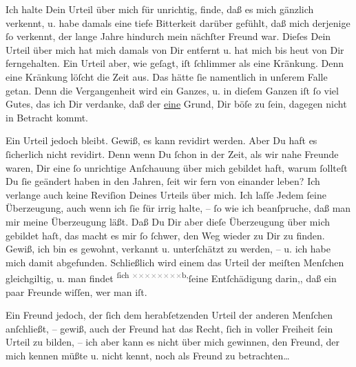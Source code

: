 \pstart
           Ich halte Dein Urteil über mich für unrichtig, finde, daß es mich gänzlich verkennt,
               u. habe \strikeout{\textcolor{gray}{d}} damals eine tiefe Bitterkeit darüber gefühlt, daß mich derjenige ſo verkennt,
               der lange Jahre hindurch mein nächſter Freund war. Dieſes Dein Urteil über mich hat
               mich damals von Dir entfernt u. hat mich bis heut von Dir ferngehalten. Ein Urteil
               aber, wie geſagt, {\pb}iſt ſchlimmer als eine
               Kränkung. Denn eine Kränkung löſcht die Zeit aus. Das hätte ſie namentlich in unſerem
               Falle getan. \strikeout{\textcolor{gray}{S}} Denn die Vergangenheit wird ein Ganzes, u. in dieſem Ganzen iſt ſo viel Gutes,
               das ich Dir verdanke, daß der \uline{eine} Grund, Dir böſe zu
               ſein, dagegen nicht in Betracht kommt.\pend
           
\pstart
           Ein Urteil jedoch bleibt. Gewiß, es kann revidirt werden. Aber Du haft es ſicherlich
               nicht revidirt. Denn wenn Du ſchon in der Zeit, als wir nahe Freunde waren, Dir eine
               ſo unrichtige Anſchauung über mich {\pb}gebildet
               haft, warum ſollteſt Du ſie geändert haben in den Jahren, ſeit wir fern von einander
               leben? Ich verlange auch keine Reviſion Deines Urteils über mich. Ich laſſe Jedem
               ſeine Überzeugung, auch wenn ich ſie für irrig halte, – ſo wie ich beanſpruche, daß
               man mir meine Überzeugung läßt. Daß Du Dir aber dieſe Überzeugung über mich gebildet
               haſt, das macht es mir ſo ſchwer, den Weg wieder zu Dir zu finden. Gewiß, ich bin es
               gewohnt, verkannt u. unterſchätzt {\pb}zu werden, –
               u. ich habe mich damit abgefunden. Schließlich wird einem das Urteil der meiſten
               Menſchen gleichgiltig, u. man findet \substVorne{}\textsuperscript{ſich \textcolor{gray}{×}\-\textcolor{gray}{×}\-\textcolor{gray}{×}\-\textcolor{gray}{×}\-\textcolor{gray}{×}\-\textcolor{gray}{×}\-\textcolor{gray}{×}\-\textcolor{gray}{×}b,}\substDazwischen{}ſeine Entſchädigung darin,\substHinten{}, daß ein paar Freunde wiſſen, wer man iſt.\pend
           
\pstart
           Ein Freund jedoch,  der ſich dem herabſetzenden Urteil der anderen Menſchen anſchließt, – gewiß,
               auch der Freund hat das Recht, ſich in voller Freiheit ſein Urteil zu bilden, – ich
               aber kann es nicht über mich {\pb}gewinnen, den
               Freund, der mich kennen müßte u. nicht kennt, noch als Freund zu betrachten{\dots}\pend
           
